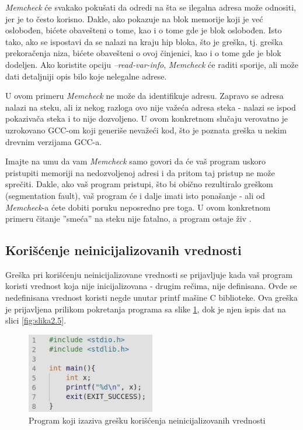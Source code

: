 \documentclass[12pt,oneside]{memoir}
\theoremstyle{plain}
\theoremstyle{definition}
\begin{document}
\textit{Memcheck} će svakako pokušati da odredi na šta se ilegalna adresa može odnositi, jer je to često korisno. Dakle, ako pokazuje na blok memorije koji je već oslobođen, bićete obavešteni o tome, kao i o tome gde je blok oslobođen. Isto tako, ako se ispostavi da se nalazi na kraju hip bloka, što je greška, tj. greška prekoračenja niza, bićete obavešteni o ovoj činjenici, kao i o tome gde je blok dodeljen. Ako koristite opciju \textit{--read-var-info}, \textit{Memcheck} će raditi sporije, ali može dati detaljniji opis bilo koje nelegalne adrese.

U ovom primeru \textit{Memcheck} ne može da identifikuje adresu. Zapravo se adresa nalazi na steku, ali iz nekog razloga ovo nije važeća adresa steka - nalazi se ispod pokazivača steka i to nije dozvoljeno. U ovom konkretnom slučaju verovatno je uzrokovano GCC-om koji generiše nevažeći kod, što je poznata greška u nekim drevnim verzijama GCC-a.

Imajte na umu da vam \textit{Memcheck} samo govori da će vaš program uskoro pristupiti memoriji na nedozvoljenoj adresi i da pritom taj pristup ne može sprečiti. Dakle, ako vaš program pristupi, što bi obično rezultiralo greškom (segmentation fault), vaš program će i dalje imati isto ponašanje - ali od \textit{Memcheck}-a ćete dobiti poruku neposredno pre toga. U ovom konkretnom primeru čitanje ''smeća'' na steku nije fatalno, a program ostaje živ \cite{Memcheck}. 

\subsection{Korišćenje neinicijalizovanih vrednosti}
Greška pri korišćenju neinicijalizovane vrednosti se prijavljuje kada vaš program koristi vrednost koja nije inicijalizovana - drugim rečima, nije definisana. Ovde se nedefinisana vrednost koristi negde unutar printf mašine C biblioteke. Ova greška je prijavljena prilikom pokretanja programa sa slike \ref{fig:slika2.4}, dok je njen ispis dat na slici \ref{fig:slika2.5}.

\begin{figure}[!ht]
  \centering
  \includegraphics[width=0.5\textwidth]{uninitialisedErrorProgram.png}
  \caption{Program koji izaziva grešku korišćenja neinicijalizovanih vrednosti}
  \label{fig:slika2.4}
\end{figure}
\end{document}
